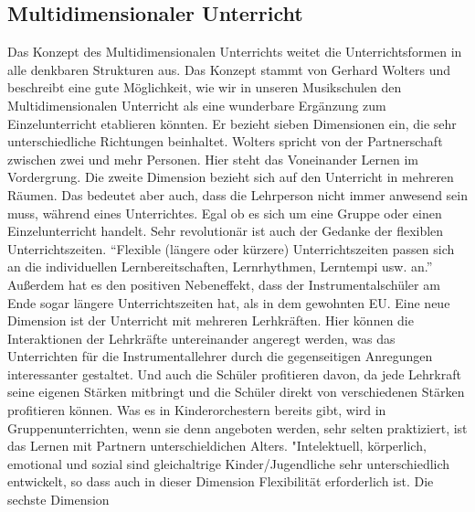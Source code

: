 





\subsection{Multidimensionaler Unterricht} 
Das Konzept des Multidimensionalen Unterrichts weitet die Unterrichtsformen in
alle denkbaren Strukturen aus. Das Konzept stammt von Gerhard Wolters und
beschreibt eine gute Möglichkeit, wie wir in unseren Musikschulen den
Multidimensionalen Unterricht als eine wunderbare Ergänzung zum Einzelunterricht
etablieren könnten. Er bezieht sieben Dimensionen ein, die sehr unterschiedliche
Richtungen beinhaltet. \autocite[86ff]{ernst:die_zukunftsfaehige_musikschule}
Wolters spricht von
der Partnerschaft zwischen zwei und mehr Personen. Hier steht das Voneinander
Lernen im Vordergrung. Die zweite Dimension bezieht sich auf den Unterricht in
mehreren Räumen. Das bedeutet aber auch, dass die Lehrperson nicht immer
anwesend sein muss, während eines Unterrichtes. Egal ob es sich um eine Gruppe
oder einen Einzelunterricht handelt. Sehr revolutionär ist auch der Gedanke der
flexiblen Unterrichtszeiten. \enquote{Flexible (längere oder kürzere) Unterrichtszeiten
passen sich an die individuellen Lernbereitschaften, Lernrhythmen, Lerntempi
usw. an.} \autocite[87]{ernst:die_zukunftsfaehige_musikschule} Außerdem hat es
den positiven Nebeneffekt, dass der Instrumentalschüler am Ende sogar längere
Unterrichtszeiten hat, als in dem gewohnten EU. Eine neue Dimension ist der
Unterricht mit mehreren Lerhkräften. Hier können die Interaktionen der
Lehrkräfte untereinander angeregt werden, was das Unterrichten für die
Instrumentallehrer durch die gegenseitigen Anregungen interessanter gestaltet.
Und auch die Schüler profitieren davon, da jede Lehrkraft seine eigenen Stärken
mitbringt und die Schüler direkt von verschiedenen Stärken profitieren können.
Was es in Kinderorchestern bereits gibt, wird in Gruppenunterrichten, wenn sie
denn angeboten werden, sehr selten praktiziert, ist das Lernen mit Partnern
unterschieldichen Alters. "Intelektuell, körperlich, emotional und sozial sind
gleichaltrige Kinder/Jugendliche sehr unterschiedlich entwickelt, so dass auch
in dieser Dimension Flexibilität erforderlich ist.
\autocite[87]{ernst:die_zukunftsfaehige_musikschule} Die sechste Dimension
